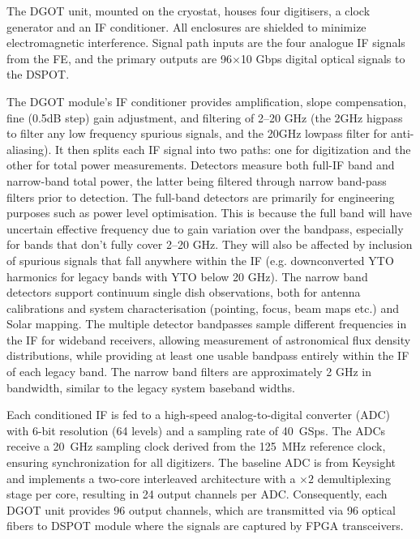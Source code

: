 The \ac{DGOT} unit, mounted on the cryostat, houses four digitisers, a clock generator and an IF conditioner.
All enclosures are shielded to minimize electromagnetic interference. Signal path inputs are the four analogue IF signals from the \ac{FE}, and the primary outputs are 96$\times$10 Gbps digital optical signals to the \ac{DSPOT}.

The \ac{DGOT} module's IF conditioner provides amplification, slope compensation, fine (0.5dB step) gain adjustment, and filtering of 2--20 GHz (the 2GHz higpass to filter any low frequency spurious signals, and the 20GHz lowpass filter for anti-aliasing). It then splits each \ac{IF} signal into two paths: one for digitization and the other for total power measurements. Detectors measure both full-IF band and narrow-band total power, the latter being filtered through narrow band-pass filters prior to detection.
The full-band detectors are primarily for engineering purposes such as power level optimisation. This is because the full band will have uncertain effective frequency due to gain variation over the bandpass, especially for bands that don't fully cover 2--20 GHz. They will also be affected by inclusion of spurious signals that fall anywhere within the IF (e.g. downconverted YTO harmonics for legacy bands with YTO below 20 GHz). The narrow band detectors support continuum single dish observations, both for antenna calibrations and system characterisation (pointing, focus, beam maps etc.) and Solar mapping. The multiple detector bandpasses sample different frequencies in the IF for wideband receivers, allowing measurement of astronomical flux density distributions, while providing at least one usable bandpass entirely within the IF of each legacy band. The narrow band filters are approximately 2 GHz in bandwidth, similar to the legacy system baseband widths.

Each conditioned IF is fed to a high-speed analog-to-digital converter (ADC) with 6-bit resolution (64 levels) and a sampling rate of 40~GSps. The ADCs receive a  20~GHz sampling clock derived from the 125~MHz reference clock, ensuring synchronization for all digitizers.
The baseline ADC is from Keysight and implements a two-core interleaved architecture with a $\times 2$ demultiplexing stage per core, resulting in 24 output channels per ADC. Consequently, each \ac{DGOT} unit provides 96 output channels, which are transmitted via 96 optical fibers to \acs{DSPOT} module where the signals are captured by FPGA transceivers.



